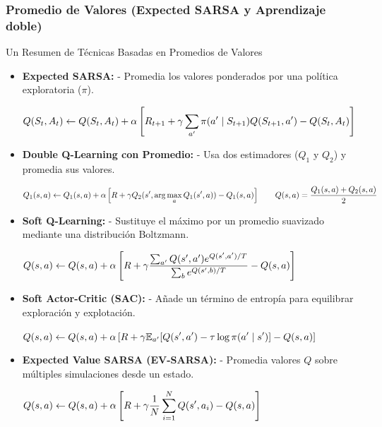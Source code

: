 \documentclass[10pt, envcountsect, handout, aspectratio=1610, hyperref={hypertexnames=true}]{beamer}
\begin{document}

\subsubsection{Promedio de Valores\newline $ $ \qquad  (Expected SARSA y Aprendizaje doble)}



\begin{frame}{Un Resumen de Técnicas Basadas en Promedios de Valores}
	\begin{itemize}
		\item \textbf{Expected SARSA:}  
		- Promedia los valores ponderados por una política exploratoria (\(\pi\)).  
	
		
		$\displaystyle
		Q(S_t, A_t) \gets Q(S_t, A_t) + \alpha \left[ R_{t+1} + \gamma \sum_{a'} \pi(a' \mid S_{t+1}) Q(S_{t+1}, a') - Q(S_t, A_t) \right]
		$
		
		\item \textbf{Double Q-Learning con Promedio:}  
		- Usa dos estimadores (\(Q_1\) y \(Q_2\)) y promedia sus valores.  
	
		
		$\displaystyle
		Q_1(s, a) \gets Q_1(s, a) + \alpha \left[ R + \gamma Q_2(s', \arg\max_a Q_1(s', a)) - Q_1(s, a) \right]  \qquad Q(s, a) = \frac{Q_1(s, a) + Q_2(s, a)}{2}
		$
		
		\item \textbf{Soft Q-Learning:}  
		- Sustituye el máximo por un promedio suavizado mediante una distribución Boltzmann.  

		
		$\displaystyle
		Q(s, a) \gets Q(s, a) + \alpha \left[ R + \gamma \frac{\sum_{a'} Q(s', a') e^{Q(s', a') / T}}{\sum_{b} e^{Q(s', b) / T}} - Q(s, a) \right]
		$
		

		\item \textbf{Soft Actor-Critic (SAC):}  
		- Añade un término de entropía para equilibrar exploración y explotación.  

		
		$\displaystyle
		Q(s, a) \gets Q(s, a) + \alpha \left[ R + \gamma \mathbb{E}_{a'} [Q(s', a') - \tau \log \pi(a' \mid s')] - Q(s, a) \right]
		$
		
		\item \textbf{Expected Value SARSA (EV-SARSA):}  
		- Promedia valores \(Q\) sobre múltiples simulaciones desde un estado. 
		
		$\displaystyle
		Q(s, a) \gets Q(s, a) + \alpha \left[ R + \gamma \frac{1}{N} \sum_{i=1}^{N} Q(s', a_i) - Q(s, a) \right]
		$
		
	\end{itemize}
\end{frame}
\end{document}
